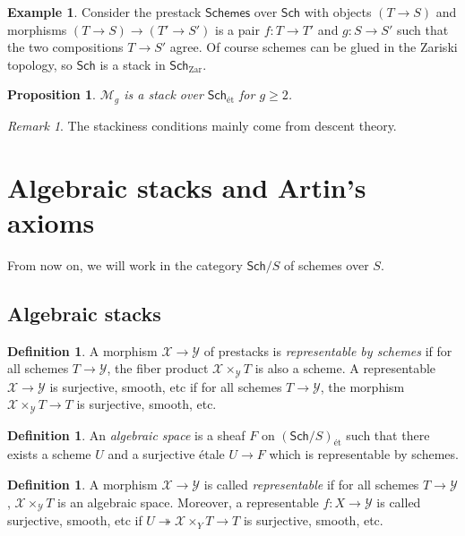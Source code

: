 \documentclass[leqno, openany]{memoir}
\newtheorem{prop}[thm]{Proposition}
\theoremstyle{definition}
\newtheorem{defn}[thm]{Definition}
\newtheorem{exm}[thm]{Example}
\theoremstyle{remark}
\newtheorem{rmk}[thm]{Remark}
\theoremstyle{plain}
\theoremstyle{definition}
\theoremstyle{remark}
\newcommand{\mc}[1]{\mathcal{#1}}
\newcommand{\mr}[1]{\mathrm{#1}}
\newcommand{\ms}[1]{\mathsf{#1}}
\begin{document}
\begin{exm}
    Consider the prestack $\ms{Schemes}$ over $\ms{Sch}$ with objects $(T \to S)$ and morphisms $(T \to S) \to (T' \to S')$ is a pair $f \colon T \to T'$ and $g \colon S \to S'$ such that the two compositions $T \to S'$ agree. Of course schemes can be glued in the Zariski topology, so $\ms{Sch}$ is a stack in $\ms{Sch}_{\mr{Zar}}$.
\end{exm}

\begin{prop}
    $\mc{M}_g$ is a stack over $\ms{Sch}_{\text{\'et}}$ for $g \geq 2$.
\end{prop}

\begin{rmk}
    The stackiness conditions mainly come from descent theory.
\end{rmk}

\section{Algebraic stacks and Artin's axioms}%
\label{sec:algebraic_stacks_and_artin_s_axioms}

From now on, we will work in the category $\ms{Sch}/S$ of schemes over $S$.

\subsection{Algebraic stacks}%
\label{sub:algebraic_stacks}

\begin{defn}
    A morphism $\mc{X} \to \mc{Y}$ of prestacks is \textit{representable by schemes} if for all schemes $T \to \mc{Y}$, the fiber product $\mc{X} \times_{\mc{Y}} T$ is also a scheme. A representable $\mc{X} \to \mc{Y}$ is surjective, smooth, etc if for all schemes $T \to \mc{Y}$, the morphism $\mc{X} \times_{\mc{Y}} T \to T$ is surjective, smooth, etc.
\end{defn}

\begin{defn}
    An \textit{algebraic space} is a sheaf $F$ on $(\ms{Sch}/S)_{\text{\'et}}$ such that there exists a scheme $U$ and a surjective \'etale $U \to F$ which is representable by schemes.
\end{defn}

\begin{defn}
    A morphism $\mc{X} \to \mc{Y}$ is called \textit{representable} if for all schemes $T \to \mc{Y}$, $\mc{X} \times_{\mc{Y}} T$ is an algebraic space. Moreover, a representable $f \colon X \to \mc{Y}$ is called surjective, smooth, etc if $U \twoheadrightarrow \mc{X} \times_Y T \to T$ is surjective, smooth, etc. 
\end{defn}
\end{document}
